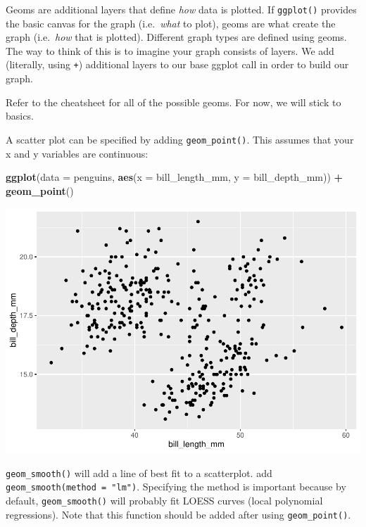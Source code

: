 \documentclass[
]{book}
\newenvironment{Shaded}{\begin{snugshade}}{\end{snugshade}}
\newcommand{\AttributeTok}[1]{\textcolor[rgb]{0.13,0.29,0.53}{#1}}
\newcommand{\FunctionTok}[1]{\textcolor[rgb]{0.13,0.29,0.53}{\textbf{#1}}}
\newcommand{\NormalTok}[1]{#1}
\newcommand{\SpecialCharTok}[1]{\textcolor[rgb]{0.81,0.36,0.00}{\textbf{#1}}}
\begin{document}
Geoms are additional layers that define \emph{how} data is plotted. If \texttt{ggplot()} provides the basic canvas for the graph (i.e.~\emph{what} to plot), geoms are what create the graph (i.e.~\emph{how} that is plotted). Different graph types are defined using geoms. The way to think of this is to imagine your graph consists of layers. We add (literally, using \texttt{+}) additional layers to our base ggplot call in order to build our graph.

Refer to the cheatsheet for all of the possible geoms. For now, we will stick to basics.

A scatter plot can be specified by adding \texttt{geom\_point()}. This assumes that your x and y variables are continuous:

\begin{Shaded}
\begin{Highlighting}[]
\FunctionTok{ggplot}\NormalTok{(}\AttributeTok{data =}\NormalTok{ penguins, }\FunctionTok{aes}\NormalTok{(}\AttributeTok{x =}\NormalTok{ bill\_length\_mm, }\AttributeTok{y =}\NormalTok{ bill\_depth\_mm)) }\SpecialCharTok{+} 
  \FunctionTok{geom\_point}\NormalTok{()}
\end{Highlighting}
\end{Shaded}

\includegraphics{_main_files/figure-latex/unnamed-chunk-52-1.pdf}

\texttt{geom\_smooth()} will add a line of best fit to a scatterplot. add \texttt{geom\_smooth(method\ =\ "lm")}. Specifying the method is important because by default, \texttt{geom\_smooth()} will probably fit LOESS curves (local polynomial regressions). Note that this function should be added after using \texttt{geom\_point()}.
\end{document}
